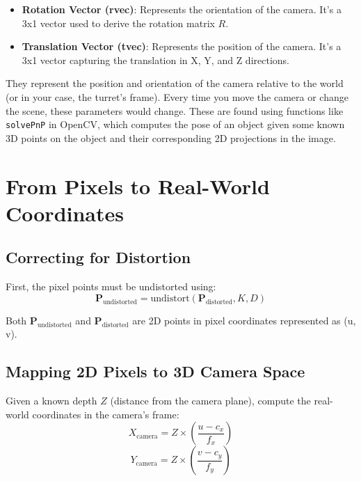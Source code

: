 \begin{itemize}
    \item \textbf{Rotation Vector (rvec)}: Represents the orientation of the camera. It's a 3x1 vector used to derive the rotation matrix \( R \).

    \item \textbf{Translation Vector (tvec)}: Represents the position of the camera. It's a 3x1 vector capturing the translation in X, Y, and Z directions.
\end{itemize}

They represent the position and orientation of the camera relative to the world (or in your case, the turret's frame). Every time you move the camera or change the scene, these parameters would change. These are found using functions like \verb|solvePnP| in OpenCV, which computes the pose of an object given some known 3D points on the object and their corresponding 2D projections in the image.

\section{From Pixels to Real-World Coordinates}

\subsection{Correcting for Distortion}
First, the pixel points must be undistorted using:
\begin{equation*}
    \textbf{P}_{\text{undistorted}} = \text{undistort}(\textbf{P}_{\text{distorted}}, K, D)
\end{equation*}


Both $\textbf{P}_{\text{undistorted}}$ and $\textbf{P}_{\text{distorted}}$ are 2D points in pixel coordinates represented as (u, v).

\subsection{Mapping 2D Pixels to 3D Camera Space}
Given a known depth \( Z \) (distance from the camera plane), compute the real-world coordinates in the camera's frame:
\begin{equation*} \label{eq:2d_to_3d}
    X_{\text{camera}} = Z \times \left( \frac{u - c_x}{f_x} \right)
\end{equation*}
\begin{equation*}
    Y_{\text{camera}} = Z \times \left( \frac{v - c_y}{f_y} \right)
\end{equation*}

